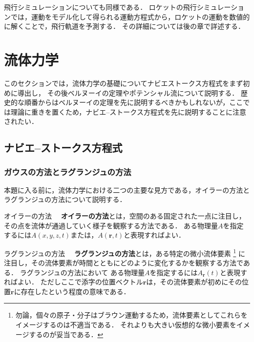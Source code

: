 \documentclass[uplatex,dvipdfmx,a4j,11pt]{jsreport}
\newcommand{\keyword}[1]{\textcolor{mainblue}{\textbf{#1}}}
\numberwithin{equation}{chapter}
\begin{document}
\enskip

飛行シミュレーションについても同様である．
ロケットの飛行シミュレーションでは，運動をモデル化して得られる運動方程式から，ロケットの運動を数値的に解くことで，飛行軌道を予測する．
その詳細については後の章で詳述する．


\chapter{流体力学}

このセクションでは，流体力学の基礎についてナビエストークス方程式をまず初めに導出し，
その後ベルヌーイの定理やポテンシャル流について説明する．
歴史的な順番からはベルヌーイの定理を先に説明するべきかもしれないが，ここでは理論に重きを置くため，ナビエ--ストークス方程式を先に説明することに注意されたい．

\section{ナビエ--ストークス方程式}
\subsection{ガウスの方法とラグランジュの方法}
本題に入る前に，流体力学における二つの主要な見方である，オイラーの方法とラグランジュの方法について説明する．

\begin{definition}{オイラーの方法}{}{}
  　\keyword{オイラーの方法}とは，空間のある固定された一点に注目し，その点を流体が通過していく様子を観察する方法である．
  ある物理量$A$を指定するには$A(x,y,z,t)$または，$A(\mathbf{r},t)$と表現すればよい．
\end{definition}

\begin{definition}{ラグランジュの方法}{}{}
  　\keyword{ラグランジュの方法}とは，ある特定の微小流体要素
  \footnote{
  勿論，個々の原子・分子はブラウン運動するため，流体要素としてこれらをイメージするのは不適当である．
  それよりも大きい仮想的な微小要素をイメージするのが妥当である．
  }
  に注目し，その流体要素が時間とともにどのように変化するかを観察する方法である．
  ラグランジュの方法において
  ある物理量$A$を指定するには$A_{\mathbf{r}}(t)$と表現すればよい．
  ただしここで添字の位置ベクトル$\mathbf{r}$は，その流体要素が初めにその位置$\mathbf{r}$に存在したという程度の意味である．
\end{definition}
\end{document}
